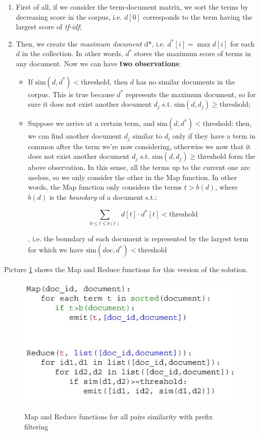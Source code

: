 \begin{enumerate}
    \item First of all, if we consider the term-document matrix, we sort the terms by decreasing score in the corpus, i.e. $d[0]$ corresponds to the term having the largest score of \textit{tf-idf};
    \item Then, we create the \textit{maximum document} d*, i.e. $d^*[i] = \max d[i]$ for each $d$ in the collection. In other words, $d^*$ stores the maximum score of terms in any document. Now we can have \textbf{two observations}:

    \begin{itemize}
        \item If $\text{sim}(d,d^*) < \text{threshold}$, then $d$ has no similar documents in the corpus. This is true because $d^*$ represents the maximum document, so for sure it does not exist another document $d_j$ s.t. $\text{sim}(d, d_j) \geq \text{threshold}$;
        \item Suppose we arrive at a certain term, and $\text{sim}(d,d^*) < \text{threshold}$: then, we can find another document $d_j$ similar to $d_i$ only if they have a term in common after the term we're now considering, otherwise we now that it does not exist another document $d_j$ s.t. $\text{sim}(d, d_j) \geq \text{threshold}$ form the above observation. In this sense, all the terms up to the current one are useless, so we only consider the other in the Map function. In other words, the Map function only considers the terms $t > b(d)$, where $b(d)$ is the \textit{boundary} of a document s.t.:

        $$
        \sum_{0 \leq t \leq b(t)} d[t] \cdot d^*[t] < \text{threshold}
        $$

        , i.e. the boundary of each document is represented by the largest term for which we have $\text{sim}(doc, d^*) < \text{threshold}$
    \end{itemize}
    
\end{enumerate}

Picture \ref{mr all pairs2} shows the Map and Reduce functions for this version of the solution.

\begin{figure}[h!]
		\centering
		\includegraphics[scale = 2.0]{img/mr ex2.jpg}
        \label{mr all pairs2}
        \caption{Map and Reduce functions for all pairs similarity with prefix filtering}
\end{figure}

